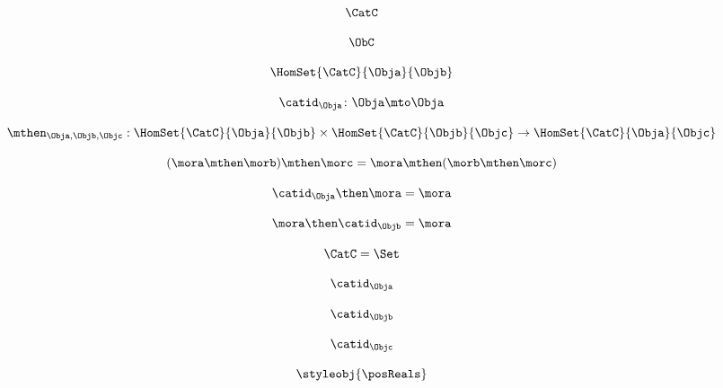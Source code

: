 {\begin{forslides}
 \begin{equation}\label{eq:15}
 \CatC
 \end{equation}
 
  \begin{equation}\label{eq:16}
 \ObC
 \end{equation}
 
  \begin{equation}\label{eq:17}
\HomSet{\CatC}{\Obja}{\Objb}
 \end{equation}
 
 \begin{equation}\label{eq:18}
\catid_{\Obja}\colon \Obja \mto \Obja
 \end{equation}
 
  \begin{equation}\label{eq:19}
        \mthen_{\Obja,\Objb,\Objc}: \HomSet{\CatC}{\Obja}{\Objb} \times \HomSet{\CatC}{\Objb}{\Objc}\to \HomSet{\CatC}{\Obja}{\Objc}
 \end{equation}

 \begin{equation}\label{eq:20}
(\mora\mthen \morb)
      \mthen \morc= \mora \mthen (\morb \mthen \morc)
 \end{equation}
 
  \begin{equation}\label{eq:21}
 \catid_{\Obja} \then \mora = \mora 
 \end{equation}
 
  \begin{equation}\label{eq:22}
\mora \then \catid_{\Objb} = \mora
 \end{equation}
 
 \begin{equation}\label{eq:23}
\CatC = \Set
 \end{equation}

 
 \begin{equation}\label{eq:24}
 \catid_{\Obja}
 \end{equation}
 
  \begin{equation}\label{eq:25}
 \catid_{\Objb}
 \end{equation}
 
 \begin{equation}\label{eq:26}
 \catid_{\Objc}
 \end{equation}
 
  \begin{equation}\label{eq:27}
 \styleobj{\posReals}
 \end{equation}
 

\end{forslides}}
